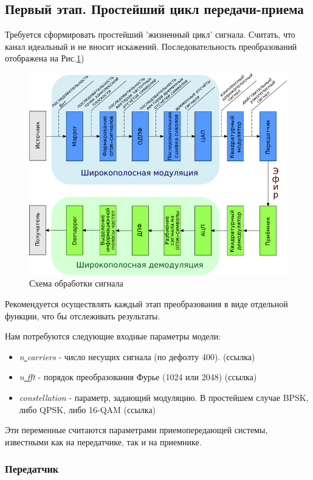 \subsection{Первый этап. Простейший цикл передачи-приема}
Требуется сформировать простейший 'жизненный цикл' сигнала.
Считать, что канал идеальный и не вносит искажений.
Последовательность преобразований отображена на Рис.\ref{fg:schem1}) 
\begin{figure}[H]
\centering
\includegraphics[width=1\textwidth]{OFDM-1}
\caption{Схема обработки сигнала} \label{fg:schem1}
\end{figure}

Рекомендуется осуществлять каждый этап преобразования в виде отдельной функции, что бы отслеживать результаты. 

Нам потребуются следующие входные параметры модели:
\begin{itemize}
\item \textit{n\underline{ }carriers} - число несущих сигнала (по дефолту 400).  (ссылка)
\item \textit{n\underline{ }fft} - порядок преобразования Фурье (1024 или 2048)  (ссылка)
\item \textit{constellation} - параметр, задающий модуляцию. В простейшем случае BPSK, либо QPSK, либо 16-QAM (ссылка)
\end{itemize}

Эти переменные считаются параметрами приемопередающей системы,  известными как на передатчике, так и на приемнике.

\subsubsection{Передатчик}

